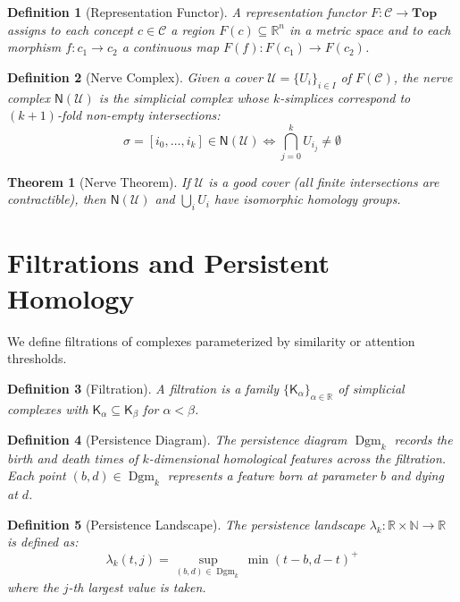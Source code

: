 \documentclass[11pt]{article}
\newtheorem{definition}{Definition}[section]
\newtheorem{theorem}{Theorem}[section]
\DeclareMathOperator{\Dgm}{Dgm}
\begin{document}
\begin{definition}[Representation Functor]
A representation functor $F:\mathcal{C}\to \mathbf{Top}$ assigns to each concept $c \in \mathcal{C}$ a region $F(c) \subseteq \mathbb{R}^n$ in a metric space and to each morphism $f: c_1 \to c_2$ a continuous map $F(f): F(c_1) \to F(c_2)$.
\end{definition}

\begin{definition}[Nerve Complex]
Given a cover $\mathcal{U} = \{U_i\}_{i \in I}$ of $F(\mathcal{C})$, the nerve complex $\mathsf{N}(\mathcal{U})$ is the simplicial complex whose $k$-simplices correspond to $(k+1)$-fold non-empty intersections:
$$\sigma = [i_0, \ldots, i_k] \in \mathsf{N}(\mathcal{U}) \iff \bigcap_{j=0}^k U_{i_j} \neq \emptyset$$
\end{definition}

\begin{theorem}[Nerve Theorem]
If $\mathcal{U}$ is a good cover (all finite intersections are contractible), then $\mathsf{N}(\mathcal{U})$ and $\bigcup_{i} U_i$ have isomorphic homology groups.
\end{theorem}

\section{Filtrations and Persistent Homology}

We define filtrations of complexes parameterized by similarity or attention thresholds.

\begin{definition}[Filtration]
A filtration is a family $\{\mathsf{K}_\alpha\}_{\alpha \in \mathbb{R}}$ of simplicial complexes with $\mathsf{K}_\alpha \subseteq \mathsf{K}_\beta$ for $\alpha < \beta$.
\end{definition}

\begin{definition}[Persistence Diagram]
The persistence diagram $\Dgm_k$ records the birth and death times of $k$-dimensional homological features across the filtration. Each point $(b, d) \in \Dgm_k$ represents a feature born at parameter $b$ and dying at $d$.
\end{definition}

\begin{definition}[Persistence Landscape]
The persistence landscape $\lambda_k: \mathbb{R} \times \mathbb{N} \to \mathbb{R}$ is defined as:
$$\lambda_k(t, j) = \sup_{(b,d) \in \Dgm_k} \min(t - b, d - t)^+$$
where the $j$-th largest value is taken.
\end{definition}
\end{document}

